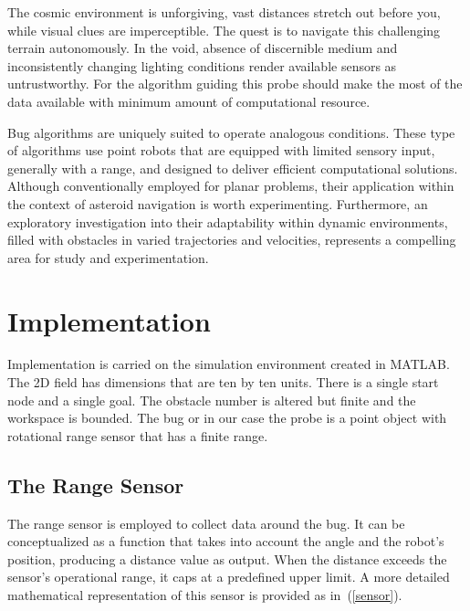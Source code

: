 \documentclass{IEEEtaes}
\begin{document}
The cosmic environment is unforgiving, vast distances stretch out before you, while visual clues are imperceptible. The quest is to navigate this challenging terrain autonomously. In the void, absence of discernible medium and inconsistently changing lighting conditions render available sensors as untrustworthy. For the algorithm guiding this probe should make the most of the data available with minimum amount of computational resource.

Bug algorithms are uniquely suited to operate analogous conditions. These type of algorithms use point robots that are equipped with limited sensory input, generally with a range, and designed to deliver efficient computational solutions. Although conventionally employed for planar problems, their application within the context of asteroid navigation is worth experimenting. Furthermore, an exploratory investigation into their adaptability within dynamic environments, filled with obstacles in varied trajectories and velocities, represents a compelling area for study and experimentation.


\section{\large \textbf{Implementation}}

\begin{figure}[t!]
    \centering
    \vspace{0.5em}
\end{figure}

Implementation is carried on the simulation environment created in MATLAB. The 2D field has dimensions that are ten by ten units. There is a single start node and a single goal. The obstacle number is altered but finite and the workspace is bounded. The bug or in our case the probe is a point object with rotational range sensor that has a finite range. 

\subsection{The Range Sensor}
The range sensor is employed to collect data around the bug. It can be conceptualized as a function that takes into account the angle and the robot's position, producing a distance value as output. When the distance exceeds the sensor's operational range, it caps at a predefined upper limit. A more detailed mathematical representation of this sensor is provided as in~(\ref{sensor}).
\end{document}

